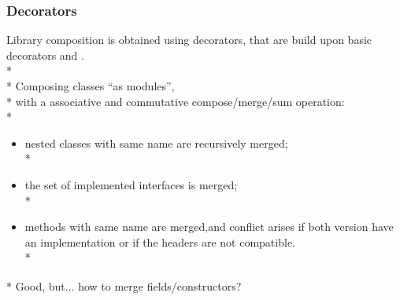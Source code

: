 %
%
%
%
%


\begin{frame}[fragile]
\frametitle{Decorators}

Library composition is obtained using decorators, that are build upon 
basic decorators \Q@Compose@ and \Q@Adapt@.\\*
${}_{}$\\*
Composing classes ``as modules'',\\*
\pause with a associative and commutative compose/merge/sum
operation:\\*
\begin{itemize}
\pause\item nested classes with same name are recursively merged;\\*
\pause\item the set of implemented interfaces is merged;\\*
\pause\item methods with same name are merged,\pause and conflict arises if both version have an implementation or if the headers are not compatible.\\*
\end{itemize}
${}_{}$\\*
\pause Good, but... how to merge fields/constructors?

\end{frame}


